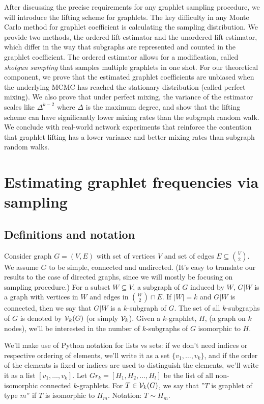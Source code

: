     After discussing the precise requirements for any graphlet sampling procedure, we will introduce the lifting scheme for graphlets.
    The key difficulty in any Monte Carlo method for graphlet coefficient is calculating the sampling distribution.
    We provide two methods, the ordered lift estimator and the unordered lift estimator, which differ in the way that subgraphs are represented and counted in the graphlet coefficient.
    The ordered estimator allows for a modification, called {\em shotgun sampling} that samples multiple graphlets in one shot. 
    For our theoretical component, we prove that the estimated graphlet coefficients are unbiased when the underlying MCMC has reached the stationary distribution (called perfect mixing).
    We also prove that under perfect mixing, the variance of the estimator scales like $\Delta^{k-2}$ where $\Delta$ is the maximum degree, and show that the lifting scheme can have significantly lower mixing rates than the subgraph random walk.
    We conclude with real-world network experiments that reinforce the contention that graphlet lifting has a lower variance and better mixing rates than subgraph random walks.

	\section{Estimating graphlet frequencies via sampling}

	\subsection{Definitions and notation}
	
	Consider graph $G=(V,E)$ with set of vertices $V$ and set of edges $E \subseteq
	\binom{V}{2}$. 
	We assume $G$ to be simple, connected and undirected. 
	(It's easy to translate our results to the case of directed graphs, since we will mostly be 
	focusing on sampling procedure.) 
	For a subset $W \subseteq V$, a subgraph of $G$ induced 
	by $W$, $G|W$ is a graph with vertices in $W$ and edges in $\binom{W}{2}\cap E$. 
	If $|W| = k$ and $G|W$ is connected, then we say that $G|W$ is a $k$-subgraph of 
	$G$. The set of all $k$-subgraphs of $G$ is denoted by $\mathcal{V}_k(G)$ (or simply $\mathcal{V}_k$).
	Given a $k$-graphlet, $H$, (a graph on $k$ nodes), we'll be interested in the number 
	of $k$-subgraphs of $G$ isomorphic to $H$.
	
	We'll make use of Python notation for lists vs sets: if we don't need indices or respective
	ordering of elements, we'll write it as a set $\{v_1, \ldots, v_k\}$, and if the 
	order of the elements is fixed or indices are used to distinguish the elements, we'll write 
	it as a list $[v_1,\ldots, v_k]$. 
	Let $Gr_k = [H_1, H_2, \ldots, H_l]$ be the list of all non-isomorphic
	connected $k$-graphlets. For $T\in \mathcal{V}_k(G)$, we say that ''$T$ is graphlet of
	 type $m$'' if $T$ is isomorphic to $H_m$. Notation: $T \sim H_m$.
	
